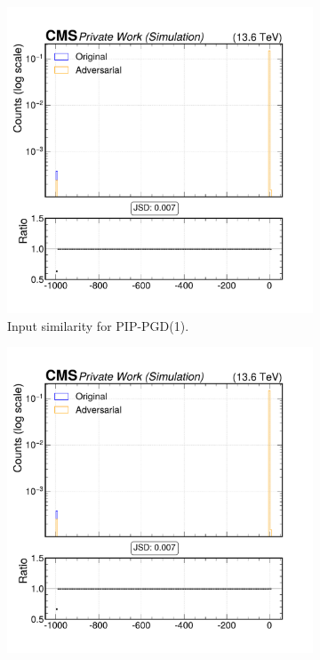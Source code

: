 \begin{figure}[h]
  \centering
  \begin{subfigure}[t]{0.32\textwidth}
    \includegraphics[width=\linewidth]{media/output/features/compare/combined_it_1/cmp_global_features_TagVarCSV_trackSumJetDeltaR.pdf}
    \caption*{Input similarity for PIP-PGD(1).}
  \end{subfigure}\hfill
  \begin{subfigure}[t]{0.32\textwidth}
    \includegraphics[width=\linewidth]{media/output/features/compare/combined_it_2/cmp_global_features_TagVarCSV_trackSumJetDeltaR.pdf}

\end{subfigure}
\end{figure}
